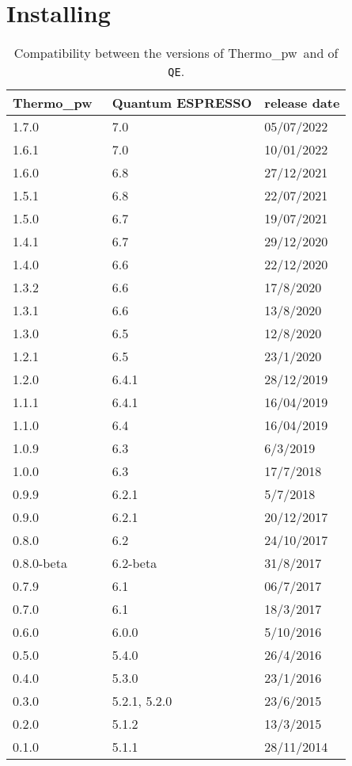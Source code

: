 \documentclass[12pt,a4paper,twoside]{report}
\def\qe{{\sc Quantum ESPRESSO}}
\def\thermo{{\sc Thermo}\_{\sc pw}}
\begin{document}
{\color{coral}\section{Installing}}
\color{black}
\begin{table}
\begin{center}
\begin{tabular}{lll}
\hline
\hline
\thermo\ & \qe & release date \\
\hline
1.7.0 & 7.0 & 05/07/2022 \\
1.6.1 & 7.0 & 10/01/2022 \\
1.6.0 & 6.8 & 27/12/2021 \\
1.5.1 & 6.8 & 22/07/2021 \\
1.5.0 & 6.7 & 19/07/2021 \\
1.4.1 & 6.7 & 29/12/2020 \\
1.4.0 & 6.6 & 22/12/2020 \\
1.3.2 & 6.6 & 17/8/2020 \\
1.3.1 & 6.6 & 13/8/2020 \\
1.3.0 & 6.5 & 12/8/2020 \\
1.2.1 & 6.5 & 23/1/2020 \\
1.2.0 & 6.4.1 & 28/12/2019 \\
1.1.1 & 6.4.1 & 16/04/2019 \\
1.1.0 & 6.4 & 16/04/2019 \\
1.0.9 & 6.3 & 6/3/2019 \\
1.0.0 & 6.3 & 17/7/2018 \\
0.9.9 & 6.2.1 & 5/7/2018 \\
0.9.0 & 6.2.1 & 20/12/2017 \\
0.8.0 & 6.2 & 24/10/2017 \\
0.8.0-beta & 6.2-beta & 31/8/2017\\
0.7.9 & 6.1 & 06/7/2017 \\
0.7.0 & 6.1 & 18/3/2017 \\
0.6.0 & 6.0.0 & 5/10/2016 \\
0.5.0 & 5.4.0 & 26/4/2016 \\
0.4.0 & 5.3.0 & 23/1/2016 \\
0.3.0 & 5.2.1, 5.2.0 & 23/6/2015 \\
0.2.0 & 5.1.2 & 13/3/2015 \\
0.1.0 & 5.1.1 & 28/11/2014 \\
\hline
\hline
\end{tabular}
\caption{Compatibility between the versions of 
\thermo\ and of \texttt{QE}.}
\end{center}
\end{table}
\end{document}
